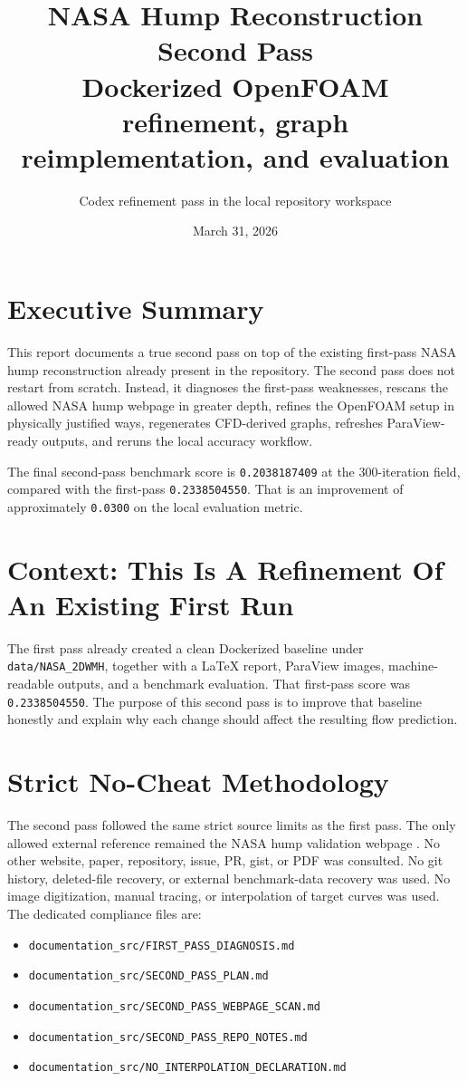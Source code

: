 \documentclass[11pt]{article}
\title{NASA Hump Reconstruction Second Pass\\\large Dockerized OpenFOAM refinement, graph reimplementation, and evaluation}
\author{Codex refinement pass in the local repository workspace}
\date{March 31, 2026}
\begin{document}
\setlength{\emergencystretch}{3em}
\maketitle

\section{Executive Summary}
This report documents a true second pass on top of the existing first-pass NASA hump reconstruction already present in the repository. The second pass does not restart from scratch. Instead, it diagnoses the first-pass weaknesses, rescans the allowed NASA hump webpage in greater depth, refines the OpenFOAM setup in physically justified ways, regenerates CFD-derived graphs, refreshes ParaView-ready outputs, and reruns the local accuracy workflow.

The final second-pass benchmark score is \texttt{0.2038187409} at the 300-iteration field, compared with the first-pass \texttt{0.2338504550}. That is an improvement of approximately \texttt{0.0300} on the local evaluation metric.

\section{Context: This Is A Refinement Of An Existing First Run}
The first pass already created a clean Dockerized baseline under \texttt{data/NASA\_2DWMH}, together with a LaTeX report, ParaView images, machine-readable outputs, and a benchmark evaluation. That first-pass score was \texttt{0.2338504550}. The purpose of this second pass is to improve that baseline honestly and explain why each change should affect the resulting flow prediction.

\section{Strict No-Cheat Methodology}
The second pass followed the same strict source limits as the first pass. The only allowed external reference remained the NASA hump validation webpage \cite{nasahump}. No other website, paper, repository, issue, PR, gist, or PDF was consulted. No git history, deleted-file recovery, or external benchmark-data recovery was used. No image digitization, manual tracing, or interpolation of target curves was used. The dedicated compliance files are:
\begin{itemize}
\item \texttt{documentation\_src/FIRST\_PASS\_DIAGNOSIS.md}
\item \texttt{documentation\_src/SECOND\_PASS\_PLAN.md}
\item \texttt{documentation\_src/SECOND\_PASS\_WEBPAGE\_SCAN.md}
\item \texttt{documentation\_src/SECOND\_PASS\_REPO\_NOTES.md}
\item \texttt{documentation\_src/NO\_INTERPOLATION\_DECLARATION.md}
\end{itemize}
\end{document}
